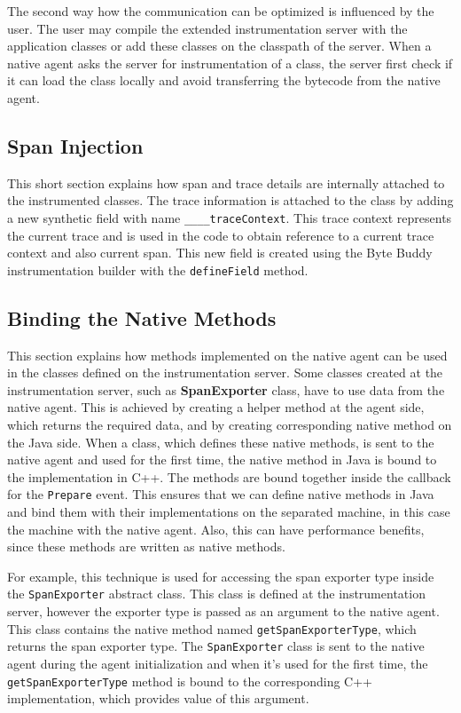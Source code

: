 The second way how the communication can be optimized is influenced by the user. The user may compile the extended instrumentation server with the application classes or add these classes on the classpath of the server. When a native agent asks the server for instrumentation of a class, the server first check if it can load the class locally and avoid transferring the bytecode from the native agent. 


\subsection{Span Injection}
This short section explains how span and trace details are internally attached to the instrumented classes. The trace information is attached to the class by adding a new synthetic field with name \texttt{\_\_\_\_traceContext}. This trace context represents the current trace and is used in the code to obtain reference to a current trace context and also current span. This new field is created using the Byte Buddy instrumentation builder with the \texttt{defineField} method.


\subsection{Binding the Native Methods}
This section explains how methods implemented on the native agent can  be used in the classes defined on the instrumentation server. Some classes created at the instrumentation server, such as \textbf{SpanExporter} class, have to use data from the native agent. This is achieved by creating a helper method at the agent side, which returns the required data, and by creating corresponding native method on the Java side. When a class, which defines these native methods, is sent to the native agent and used for the first time, the native method in Java is bound to the implementation in C++. The methods are bound together inside the callback for the \texttt{Prepare} event. This ensures that we can define native methods in Java and bind them with their implementations on the separated machine, in this case the machine with the native agent. Also, this can have performance benefits, since these methods are written as native methods.

For example, this technique is used for accessing the span exporter type inside the \texttt{SpanExporter} abstract class. This class is defined at the instrumentation server, however the exporter type is passed as an argument to the native agent. This class contains the native method named \texttt{getSpanExporterType}, which returns the span exporter type. The \texttt{SpanExporter} class is sent to the native agent during the agent initialization and when it's used for the first time, the \texttt{getSpanExporterType} method is bound to the corresponding C++ implementation, which provides value of this argument.

